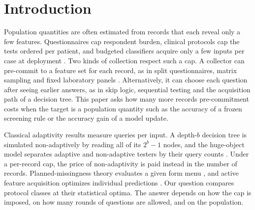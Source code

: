 \documentclass{article}
\begin{document}
\section{Introduction}
Population quantities are often estimated from records that each reveal only a few features. Questionnaires cap respondent burden, clinical protocols cap the tests ordered per patient, and budgeted classifiers acquire only a few inputs per case at deployment \citep{turney1995,trapeznikov2013,nan2017}. Two kinds of collection respect such a cap. A collector can pre-commit to a feature set for each record, as in split questionnaires, matrix sampling and fixed laboratory panels \citep{raghunathan1995,chipperfield2009}. Alternatively, it can choose each question after seeing earlier answers, as in skip logic, sequential testing and the acquisition path of a decision tree. This paper asks how many more records pre-commitment costs when the target is a population quantity such as the accuracy of a frozen screening rule or the accuracy gain of a model update.

Classical adaptivity results measure queries per input. A depth-$b$ decision tree is simulated non-adaptively by reading all of its $2^b-1$ nodes, and the huge-object model separates adaptive and non-adaptive testers by their query counts \citep{goldreich2022,chakraborty2023,adar2024}. Under a per-record cap, the price of non-adaptivity is paid instead in the number of records. Planned-missingness theory evaluates a given form menu \citep{robins1994,tsiatis2006}, and active feature acquisition optimizes individual predictions \citep{ma2019,covert2023}. Our question compares protocol classes at their statistical optima. The answer depends on how the cap is imposed, on how many rounds of questions are allowed, and on the population.
\end{document}
